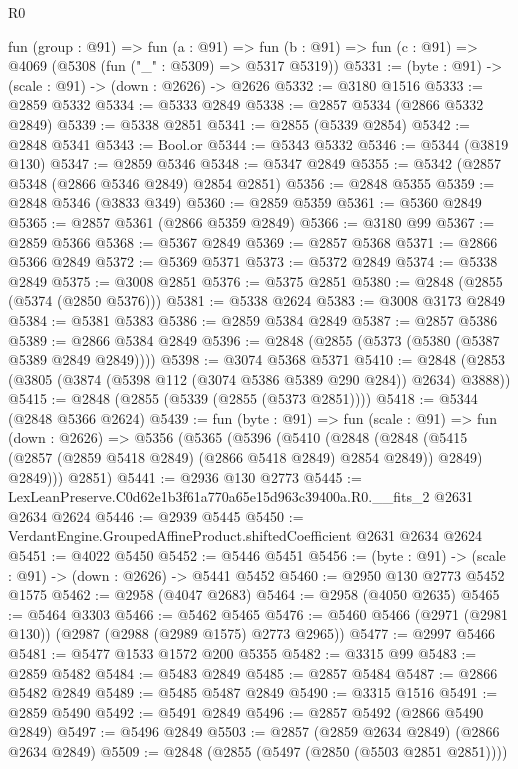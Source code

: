 \begin{lexlean}{R0}
\begin{coremodule}
  fun (group : @91) =>
  fun (a : @91) =>
  fun (b : @91) => fun (c : @91) => @4069 (@5308 (fun ("_" : @5309) => @5317 @5319))
@5331 := (byte : @91) -> (scale : @91) -> (down : @2626) -> @2626
@5332 := @3180 @1516
@5333 := @2859 @5332
@5334 := @5333 @2849
@5338 := @2857 @5334 (@2866 @5332 @2849)
@5339 := @5338 @2851
@5341 := @2855 (@5339 @2854)
@5342 := @2848 @5341
@5343 := Bool.or
@5344 := @5343 @5332
@5346 := @5344 (@3819 @130)
@5347 := @2859 @5346
@5348 := @5347 @2849
@5355 := @5342 (@2857 @5348 (@2866 @5346 @2849) @2854 @2851)
@5356 := @2848 @5355
@5359 := @2848 @5346 (@3833 @349)
@5360 := @2859 @5359
@5361 := @5360 @2849
@5365 := @2857 @5361 (@2866 @5359 @2849)
@5366 := @3180 @99
@5367 := @2859 @5366
@5368 := @5367 @2849
@5369 := @2857 @5368
@5371 := @2866 @5366 @2849
@5372 := @5369 @5371
@5373 := @5372 @2849
@5374 := @5338 @2849
@5375 := @3008 @2851
@5376 := @5375 @2851
@5380 := @2848 (@2855 (@5374 (@2850 @5376)))
@5381 := @5338 @2624
@5383 := @3008 @3173 @2849
@5384 := @5381 @5383
@5386 := @2859 @5384 @2849
@5387 := @2857 @5386
@5389 := @2866 @5384 @2849
@5396 := @2848 (@2855 (@5373 (@5380 (@5387 @5389 @2849 @2849))))
@5398 := @3074 @5368 @5371
@5410 := @2848 (@2853 (@3805 (@3874 (@5398 @112 (@3074 @5386 @5389 @290 @284)) @2634) @3888))
@5415 := @2848 (@2855 (@5339 (@2855 (@5373 @2851))))
@5418 := @5344 (@2848 @5366 @2624)
@5439 := fun (byte : @91) =>
  fun (scale : @91) =>
  fun (down : @2626) =>
  @5356
    (@5365
      (@5396
        (@5410
          (@2848
            (@2848 (@5415 (@2857 (@2859 @5418 @2849) (@2866 @5418 @2849) @2854 @2849)) @2849)
            @2849)))
      @2851)
@5441 := @2936 @130 @2773
@5445 := LexLeanPreserve.C0d62e1b3f61a770a65e15d963c39400a.R0.__fits_2 @2631 @2634 @2624
@5446 := @2939 @5445
@5450 := VerdantEngine.GroupedAffineProduct.shiftedCoefficient @2631 @2634 @2624
@5451 := @4022 @5450
@5452 := @5446 @5451
@5456 := (byte : @91) -> (scale : @91) -> (down : @2626) -> @5441 @5452
@5460 := @2950 @130 @2773 @5452 @1575
@5462 := @2958 (@4047 @2683)
@5464 := @2958 (@4050 @2635)
@5465 := @5464 @3303
@5466 := @5462 @5465
@5476 := @5460 @5466 (@2971 (@2981 @130)) (@2987 (@2988 (@2989 @1575) @2773 @2965))
@5477 := @2997 @5466
@5481 := @5477 @1533 @1572 @200 @5355
@5482 := @3315 @99
@5483 := @2859 @5482
@5484 := @5483 @2849
@5485 := @2857 @5484
@5487 := @2866 @5482 @2849
@5489 := @5485 @5487 @2849
@5490 := @3315 @1516
@5491 := @2859 @5490
@5492 := @5491 @2849
@5496 := @2857 @5492 (@2866 @5490 @2849)
@5497 := @5496 @2849
@5503 := @2857 (@2859 @2634 @2849) (@2866 @2634 @2849)
@5509 := @2848 (@2855 (@5497 (@2850 (@5503 @2851 @2851))))

\end{coremodule}
\end{lexlean}
